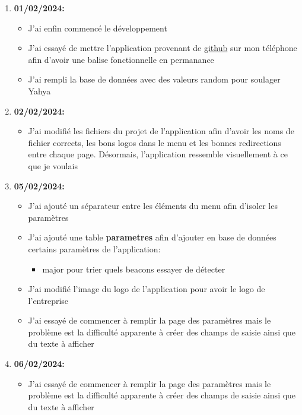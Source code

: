 \documentclass[10pt,a4paper]{article}
\begin{document}
\begin{enumerate}
\begin{itemize}
        \end{itemize}
    \item \textbf{01/02/2024:}
        \begin{itemize}
            \item J'ai enfin commencé le développement
            \item J'ai essayé de mettre l'application provenant de \href{https://github.com/Gabin221/android-beacon-library-reference-kotlin}{github} sur mon téléphone afin d'avoir une balise fonctionnelle en permanance
            \item J'ai rempli la base de données avec des valeurs random pour soulager Yahya
        \end{itemize}
    \item \textbf{02/02/2024:}
        \begin{itemize}
            \item J'ai modifié les fichiers du projet de l'application afin d'avoir les noms de fichier corrects, les bons logos dans le menu et les bonnes redirections entre chaque page. Désormais, l'application ressemble visuellement à ce que je voulais
        \end{itemize}
    \item \textbf{05/02/2024:}
        \begin{itemize}
            \item J'ai ajouté un séparateur entre les éléments du menu afin d'isoler les paramètres
            \item J'ai ajouté une table \textbf{parametres} afin d'ajouter en base de données certains paramètres de l'application: 
                \begin{itemize}
                    \item major pour trier quels beacons essayer de détecter
                \end{itemize}
            \item J'ai modifié l'image du logo de l'application pour avoir le logo de l'entreprise
            \item J'ai essayé de commencer à remplir la page des paramètres mais le problème est la difficulté apparente à créer des champs de saisie ainsi que du texte à afficher
        \end{itemize}
    \item \textbf{06/02/2024:}
        \begin{itemize}
            \item J'ai essayé de commencer à remplir la page des paramètres mais le problème est la difficulté apparente à créer des champs de saisie ainsi que du texte à afficher
        \end{itemize}
\end{enumerate}
\end{document}
